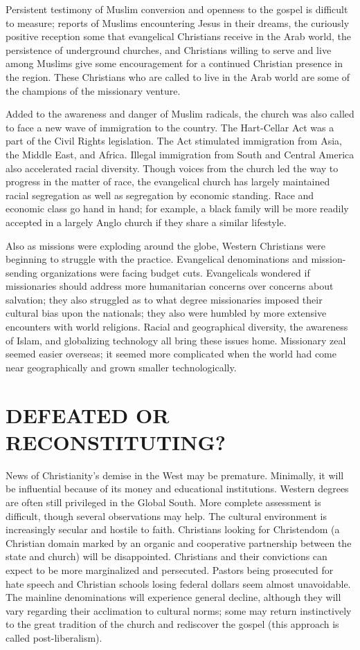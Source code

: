 Persistent testimony of Muslim conversion and openness to the gospel is difficult to measure;
reports of Muslims encountering Jesus in their dreams, the curiously positive reception some that
evangelical Christians receive in the Arab world, the persistence of underground churches, and
Christians willing to serve and live among Muslims give some encouragement for a continued Christian
presence in the region. These Christians who are called to live in the Arab world are some of the
champions of the missionary venture.

Added to the awareness and danger of Muslim radicals, the church was also called to face a new wave
of immigration to the country. The Hart-Cellar Act was a part of the Civil Rights legislation. The
Act stimulated immigration from Asia, the Middle East, and Africa. Illegal immigration from South
and Central America also accelerated racial diversity. Though voices from the church led the way to
progress in the matter of race, the evangelical church has largely maintained racial segregation as
well as segregation by economic standing. Race and economic class go hand in hand; for example, a
black family will be more readily accepted in a largely Anglo church if they share a similar
lifestyle.

Also as missions were exploding around the globe, Western Christians were beginning to struggle with
the practice. Evangelical denominations and mission-sending organizations were facing budget cuts.
Evangelicals wondered if missionaries should address more humanitarian concerns over concerns about
salvation; they also struggled as to what degree missionaries imposed their cultural bias upon the
nationals; they also were humbled by more extensive encounters with world religions. Racial and
geographical diversity, the awareness of Islam, and globalizing technology all bring these issues
home. Missionary zeal seemed easier overseas; it seemed more complicated when the world had come
near geographically and grown smaller technologically.

\section{DEFEATED OR RECONSTITUTING?}

News of Christianity’s demise in the West may be premature. Minimally, it will be influential
because of its money and educational institutions. Western degrees are often still privileged in the
Global South. More complete assessment is difficult, though several observations may help. The
cultural environment is increasingly secular and hostile to faith. Christians looking for
Christendom (a Christian domain marked by an organic and cooperative partnership between the state
and church) will be disappointed. Christians and their convictions can expect to be more
marginalized and persecuted. Pastors being prosecuted for hate speech and Christian schools losing
federal dollars seem almost unavoidable. The mainline denominations will experience general decline,
although they will vary regarding their acclimation to cultural norms; some may return instinctively
to the great tradition of the church and rediscover the gospel (this approach is called
post-liberalism).

